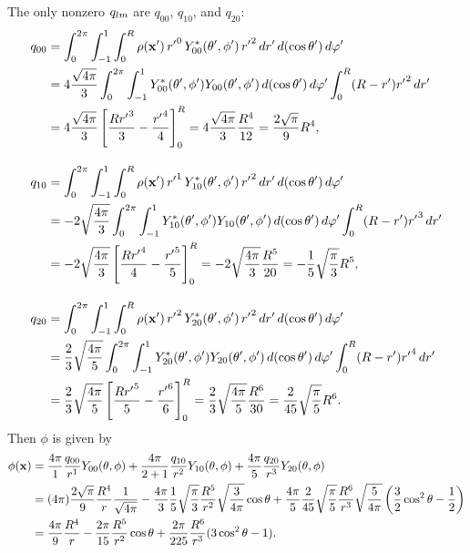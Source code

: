 \begin{solution}
	The only nonzero $q_{l m}$ are $q_{0 0}$, $q_{1 0}$, and $q_{2 0}$:
	\begin{align*}
		q_{0 0} &= \int_0^{2\pi} \int_{-1}^1 \int_0^R \rho(\mathbf{x}') \, {r'}^0 \, Y_{0 0}^*(\theta', \phi') \, {r'}^2 \dd{r'} \dd{(\cos\theta')} \dd{\varphi'} \\
		&= 4 \frac{\sqrt{4\pi}}{3} \int_0^{2\pi} \int_{-1}^1 Y_{0 0}^*(\theta', \phi') Y_{0 0} (\theta', \phi') \dd{(\cos\theta')} \dd{\varphi'} \int_0^R (R - r') {r'}^2 \dd{r'} \\
		&= 4 \frac{\sqrt{4\pi}}{3} \left[ \frac{R {r'}^3}{3} - \frac{{r'}^4}{4} \right]_0^R
		= 4 \frac{\sqrt{4\pi}}{3} \frac{R^4}{12}
		= \frac{2 \sqrt{\pi}}{9} R^4, \\[1em]
		q_{1 0} &= \int_0^{2\pi} \int_{-1}^1 \int_0^R \rho(\mathbf{x}') \, {r'}^1 \, Y_{1 0}^*(\theta', \phi') \, {r'}^2 \dd{r'} \dd{(\cos\theta')} \dd{\varphi'} \\
		&= -2 \sqrt{\frac{4\pi}{3}} \int_0^{2\pi} \int_{-1}^1 Y_{1 0}^*(\theta', \phi') Y_{1 0} (\theta', \phi') \dd{(\cos\theta')} \dd{\varphi'} \int_0^R (R - r') {r'}^3 \dd{r'} \\
		&= -2 \sqrt{\frac{4\pi}{3}} \left[\frac{R {r'}^4}{4} - \frac{{r'}^5}{5} \right]_0^R
		= -2 \sqrt{\frac{4\pi}{3}} \frac{R^5}{20}
		= -\frac{1}{5} \sqrt{\frac{\pi}{3}} R^5, \\[1em]
		q_{2 0} &= \int_0^{2\pi} \int_{-1}^1 \int_0^R \rho(\mathbf{x}') \, {r'}^2 \, Y_{2 0}^*(\theta', \phi') \, {r'}^2 \dd{r'} \dd{(\cos\theta')} \dd{\varphi'} \\
		&= \frac{2}{3} \sqrt{\frac{4\pi}{5}} \int_0^{2\pi} \int_{-1}^1 Y_{2 0}^*(\theta', \phi') Y_{2 0} (\theta', \phi') \dd{(\cos\theta')} \dd{\varphi'} \int_0^R (R - r') {r'}^4 \dd{r'} \\
		&= \frac{2}{3} \sqrt{\frac{4\pi}{5}} \left[ \frac{R {r'}^5}{5} - \frac{{r'}^6}{6} \right]_0^R
		= \frac{2}{3} \sqrt{\frac{4\pi}{5}} \frac{R^6}{30}
		= \frac{2}{45} \sqrt{\frac{\pi}{5}} R^6.
	\end{align*}
	Then $\phi$ is given by
	\begin{align*}
		\phi(\mathbf{x}) &= \frac{4\pi}{1} \frac{q_{0 0}}{r^1} Y_{0 0}(\theta, \phi) + \frac{4\pi}{2 + 1} \frac{q_{1 0}}{r^2} Y_{1 0}(\theta, \phi) + \frac{4\pi}{5} \frac{q_{2 0}}{r^3} Y_{2 0}(\theta, \phi) \\
		&= (4\pi) \frac{2 \sqrt{\pi}}{9} \frac{R^4}{r} \frac{1}{\sqrt{4 \pi}} - \frac{4\pi}{3} \frac{1}{5} \sqrt{\frac{\pi}{3}} \frac{R^5}{r^2} \sqrt{\frac{3}{4\pi}} \cos\theta + \frac{4\pi}{5} \frac{2}{45} \sqrt{\frac{\pi}{5}} \frac{R^6}{r^3} \sqrt{\frac{5}{4\pi}} \left( \frac{3}{2} \cos^2\theta - \frac{1}{2} \right) \\
		&= \frac{4\pi}{9} \frac{R^4}{r} - \frac{2 \pi}{15} \frac{R^5}{r^2} \cos\theta + \frac{2\pi}{225} \frac{R^6}{r^3} (3 \cos^2\theta - 1).
	\end{align*}
\end{solution}
\vfix
